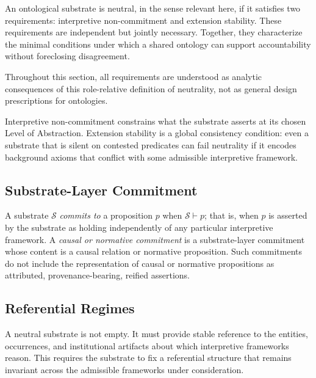 An ontological substrate is neutral, in the sense relevant here,
if it satisfies two requirements:
interpretive non-commitment and extension stability.
These requirements are independent but jointly necessary.
Together, they characterize the minimal conditions
under which a shared ontology can support accountability
without foreclosing disagreement.

Throughout this section, all requirements are understood
as analytic consequences of this
role-relative definition of neutrality,
not as general design prescriptions for ontologies.

Interpretive non-commitment constrains what the substrate asserts
at its chosen Level of Abstraction.
Extension stability is a global consistency condition:
even a substrate that is silent on contested predicates
can fail neutrality if it encodes background axioms
that conflict with some admissible interpretive framework.

\subsection{Substrate-Layer Commitment}
\label{subsec:substrate-layer-commitment}

\begin{definition}
\label{def:substrate-layer-commitment}
A substrate $\mathcal{S}$ \emph{commits to} a proposition $p$
when $\mathcal{S} \vdash p$;
that is, when $p$ is asserted by the substrate
as holding independently of any particular interpretive framework.
A \emph{causal or normative commitment} is a substrate-layer
commitment whose content is a causal relation or normative proposition.
Such commitments do not include the representation of causal or
normative propositions as attributed, provenance-bearing,
reified assertions.
\end{definition}

\subsection{Referential Regimes}
\label{subsec:referential-regimes}

A neutral substrate is not empty.
It must provide stable reference to the entities, occurrences,
and institutional artifacts about which interpretive frameworks reason.
This requires the substrate to fix a referential structure
that remains invariant
across the admissible frameworks under consideration.

